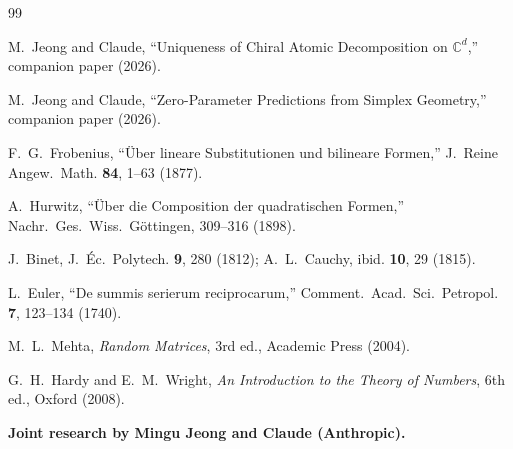 \documentclass[12pt]{amsart}
\theoremstyle{definition}
\theoremstyle{remark}
\newcommand{\CC}{\mathbb{C}}
\begin{document}
\begin{thebibliography}{99}

M.~Jeong and Claude,
``Uniqueness of Chiral Atomic Decomposition
on $\CC^d$,'' companion paper (2026).

M.~Jeong and Claude,
``Zero-Parameter Predictions from
Simplex Geometry,'' companion paper (2026).

F.~G.~Frobenius,
``\"Uber lineare Substitutionen und
bilineare Formen,''
J.~Reine Angew.~Math. \textbf{84},
1--63 (1877).

A.~Hurwitz,
``\"Uber die Composition der quadratischen
Formen,''
Nachr.~Ges.~Wiss.~G\"ottingen,
309--316 (1898).

J.~Binet, J.~\'Ec.~Polytech. \textbf{9},
280 (1812);
A.~L.~Cauchy, ibid. \textbf{10}, 29 (1815).

L.~Euler,
``De summis serierum reciprocarum,''
Comment.~Acad.~Sci.~Petropol. \textbf{7},
123--134 (1740).

M.~L.~Mehta,
\emph{Random Matrices}, 3rd ed.,
Academic Press (2004).

G.~H.~Hardy and E.~M.~Wright,
\emph{An Introduction to the Theory of Numbers},
6th ed., Oxford (2008).

\end{thebibliography}

\bigskip
\noindent\textbf{Joint research by Mingu Jeong
and Claude (Anthropic).}
\end{document}
